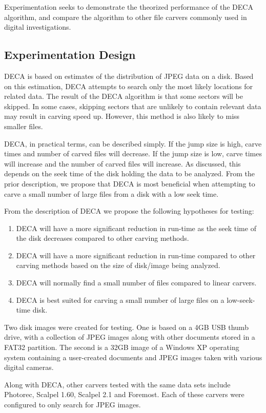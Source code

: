 \documentclass[final,5p,times,twocolumn,authoryear]{elsarticle}
\begin{document}
Experimentation seeks to demonstrate the theorized performance of the DECA algorithm, and compare the algorithm to other file carvers commonly used in digital investigations.

\subsection{Experimentation Design}
DECA is based on estimates of the distribution of JPEG data on a disk. Based on this estimation, DECA attempts to search only the most likely locations for related data. The result of the DECA algorithm is that some sectors will be skipped. In some cases, skipping sectors that are unlikely to contain relevant data may result in carving speed up. However, this method is also likely to miss smaller files.

DECA, in practical terms, can be described simply. If the jump size is high, carve times and number of carved files will decrease. If the jump size is low, carve times will increase and the number of carved files will increase. As discussed, this depends on the seek time of the disk holding the data to be analyzed. From the prior description, we propose that DECA is most beneficial when attempting to carve a small number of large files from a disk with a low seek time.

From the description of DECA we propose the following hypotheses for testing:
\begin{enumerate}
	\item DECA will have a more significant reduction in run-time as the seek time of the disk decreases compared to other carving methods.
	\item DECA will have a more significant reduction in run-time compared to other carving methods based on the size of disk/image being analyzed.
	\item DECA will normally find a small number of files compared to linear carvers.
	\item DECA is best suited for carving a small number of large files on a low-seek-time disk.
\end{enumerate}

Two disk images were created for testing. One is based on a 4GB USB thumb drive, with a collection of JPEG images along with other documents stored in a FAT32 partition. The second is a 32GB image of a Windows XP operating system containing a user-created documents and JPEG images taken with various digital cameras.

Along with DECA, other carvers tested with the same data sets include Photorec, Scalpel 1.60, Scalpel 2.1 and Foremost. Each of these carvers were configured to only search for JPEG images.
\end{document}
